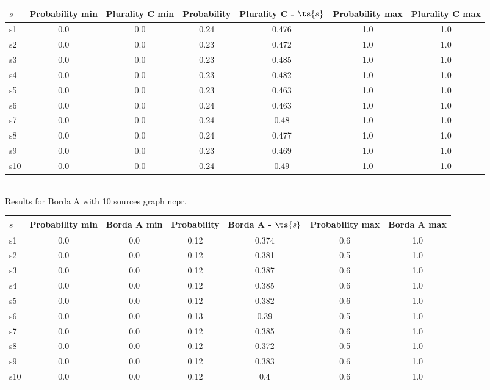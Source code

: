 \documentclass{article}
\begin{document}
\noindent\begin{tabular}{|l|c|c|c|c|c|c|}
\hline
$s$& Probability min & Plurality C min & Probability & Plurality C - $\ts{s}$ & Probability max & Plurality C max\\
\hline
s1 &0.0 & 0.0 & 0.24 & 0.476 & 1.0 & 1.0\\
\hline
s2 &0.0 & 0.0 & 0.23 & 0.472 & 1.0 & 1.0\\
\hline
s3 &0.0 & 0.0 & 0.23 & 0.485 & 1.0 & 1.0\\
\hline
s4 &0.0 & 0.0 & 0.23 & 0.482 & 1.0 & 1.0\\
\hline
s5 &0.0 & 0.0 & 0.23 & 0.463 & 1.0 & 1.0\\
\hline
s6 &0.0 & 0.0 & 0.24 & 0.463 & 1.0 & 1.0\\
\hline
s7 &0.0 & 0.0 & 0.24 & 0.48 & 1.0 & 1.0\\
\hline
s8 &0.0 & 0.0 & 0.24 & 0.477 & 1.0 & 1.0\\
\hline
s9 &0.0 & 0.0 & 0.23 & 0.469 & 1.0 & 1.0\\
\hline
s10 &0.0 & 0.0 & 0.24 & 0.49 & 1.0 & 1.0\\
\hline
\end{tabular}\\

\noindent Results for Borda A with 10 sources graph ncpr.

\noindent\begin{tabular}{|l|c|c|c|c|c|c|}
\hline
$s$& Probability min & Borda A min & Probability & Borda A - $\ts{s}$ & Probability max & Borda A max\\
\hline
s1 &0.0 & 0.0 & 0.12 & 0.374 & 0.6 & 1.0\\
\hline
s2 &0.0 & 0.0 & 0.12 & 0.381 & 0.5 & 1.0\\
\hline
s3 &0.0 & 0.0 & 0.12 & 0.387 & 0.6 & 1.0\\
\hline
s4 &0.0 & 0.0 & 0.12 & 0.385 & 0.6 & 1.0\\
\hline
s5 &0.0 & 0.0 & 0.12 & 0.382 & 0.6 & 1.0\\
\hline
s6 &0.0 & 0.0 & 0.13 & 0.39 & 0.5 & 1.0\\
\hline
s7 &0.0 & 0.0 & 0.12 & 0.385 & 0.6 & 1.0\\
\hline
s8 &0.0 & 0.0 & 0.12 & 0.372 & 0.5 & 1.0\\
\hline
s9 &0.0 & 0.0 & 0.12 & 0.383 & 0.6 & 1.0\\
\hline
s10 &0.0 & 0.0 & 0.12 & 0.4 & 0.6 & 1.0\\
\hline
\end{tabular}\\
\end{document}
